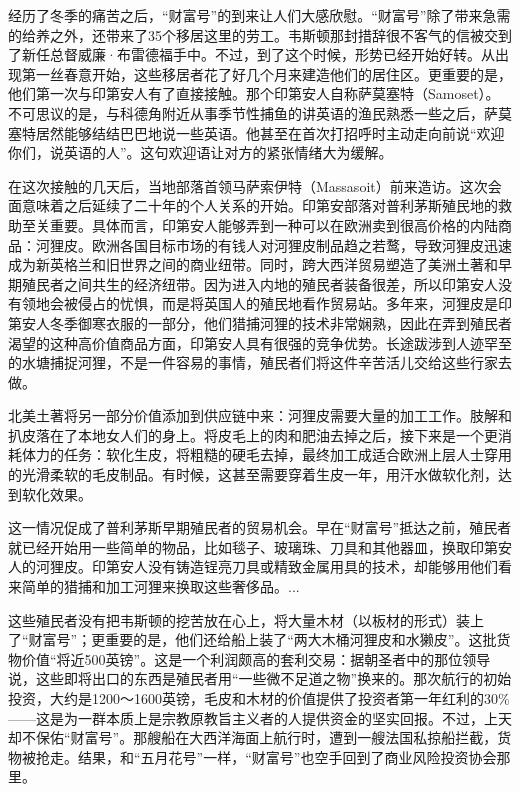 \documentclass[12pt,oneside]{book}
\begin{document}
\begin{mdframed}
经历了冬季的痛苦之后，“财富号”的到来让人们大感欣慰。“财富号”除了带来急需的给养之外，还带来了35个移居这里的劳工。韦斯顿那封措辞很不客气的信被交到了新任总督威廉·布雷德福手中。不过，到了这个时候，形势已经开始好转。从出现第一丝春意开始，这些移居者花了好几个月来建造他们的居住区。更重要的是，他们第一次与印第安人有了直接接触。那个印第安人自称萨莫塞特（Samoset）。不可思议的是，与科德角附近从事季节性捕鱼的讲英语的渔民熟悉一些之后，萨莫塞特居然能够结结巴巴地说一些英语。他甚至在首次打招呼时主动走向前说“欢迎你们，说英语的人”。这句欢迎语让对方的紧张情绪大为缓解。

在这次接触的几天后，当地部落首领马萨索伊特（Massasoit）前来造访。这次会面意味着之后延续了二十年的个人关系的开始。印第安部落对普利茅斯殖民地的救助至关重要。具体而言，印第安人能够弄到一种可以在欧洲卖到很高价格的内陆商品：河狸皮。欧洲各国目标市场的有钱人对河狸皮制品趋之若鹜，导致河狸皮迅速成为新英格兰和旧世界之间的商业纽带。同时，跨大西洋贸易塑造了美洲土著和早期殖民者之间共生的经济纽带。因为进入内地的殖民者装备很差，所以印第安人没有领地会被侵占的忧惧，而是将英国人的殖民地看作贸易站。多年来，河狸皮是印第安人冬季御寒衣服的一部分，他们猎捕河狸的技术非常娴熟，因此在弄到殖民者渴望的这种高价值商品方面，印第安人具有很强的竞争优势。长途跋涉到人迹罕至的水塘捕捉河狸，不是一件容易的事情，殖民者们将这件辛苦活儿交给这些行家去做。

北美土著将另一部分价值添加到供应链中来：河狸皮需要大量的加工工作。肢解和扒皮落在了本地女人们的身上。将皮毛上的肉和肥油去掉之后，接下来是一个更消耗体力的任务：软化生皮，将粗糙的硬毛去掉，最终加工成适合欧洲上层人士穿用的光滑柔软的毛皮制品。有时候，这甚至需要穿着生皮一年，用汗水做软化剂，达到软化效果。

这一情况促成了普利茅斯早期殖民者的贸易机会。早在“财富号”抵达之前，殖民者就已经开始用一些简单的物品，比如毯子、玻璃珠、刀具和其他器皿，换取印第安人的河狸皮。印第安人没有铸造锃亮刀具或精致金属用具的技术，却能够用他们看来简单的猎捕和加工河狸来换取这些奢侈品。...

这些殖民者没有把韦斯顿的挖苦放在心上，将大量木材（以板材的形式）装上了“财富号”；更重要的是，他们还给船上装了“两大木桶河狸皮和水獭皮”。这批货物价值“将近500英镑”。这是一个利润颇高的套利交易：据朝圣者中的那位领导说，这些即将出口的东西是殖民者用“一些微不足道之物”换来的。那次航行的初始投资，大约是1200～1600英镑，毛皮和木材的价值提供了投资者第一年红利的30\%——这是为一群本质上是宗教原教旨主义者的人提供资金的坚实回报。不过，上天却不保佑“财富号”。那艘船在大西洋海面上航行时，遭到一艘法国私掠船拦截，货物被抢走。结果，和“五月花号”一样，“财富号”也空手回到了商业风险投资协会那里。


\end{mdframed}
\end{document}
